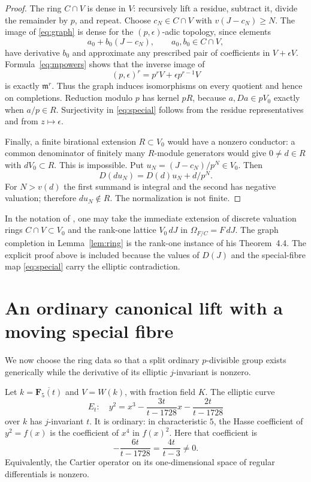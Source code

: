 \documentclass[11pt]{article}
\theoremstyle{remark}\newtheorem{remark}[theorem]{Remark}
\begin{document}
\begin{proof}
The ring $C\cap V$ is dense in $V$: recursively lift a residue, subtract it, divide the remainder by $p$, and repeat. Choose $c_N\in C\cap V$ with $v(J-c_N)\geq N$. The image of \eqref{eq:graph} is dense for the $(p,\epsilon)$-adic topology, since elements
\[
 a_0+b_0(J-c_N),\qquad a_0,b_0\in C\cap V,
\]
have derivative $b_0$ and approximate any prescribed pair of coefficients in $V+\epsilon V$. Formula~\eqref{eq:mpowers} shows that the inverse image of
\[
 (p,\epsilon)^r=p^rV+\epsilon p^{r-1}V
\]
is exactly $\mathfrak m^r$. Thus the graph induces isomorphisms on every quotient and hence on completions. Reduction modulo $p$ has kernel $pR$, because $a,Da\in pV_0$ exactly when $a/p\in R$. Surjectivity in \eqref{eq:special} follows from the residue representatives and from $z\mapsto\epsilon$.

Finally, a finite birational extension $R\subset V_0$ would have a nonzero conductor: a common denominator of finitely many $R$-module generators would give $0\ne d\in R$ with $dV_0\subset R$. This is impossible. Put $u_N=(J-c_N)/p^N\in V_0$. Then
\[
 D(du_N)=D(d)u_N+d/p^N.
\]
For $N>v(d)$ the first summand is integral and the second has negative valuation; therefore $du_N\notin R$. The normalization is not finite.
\end{proof}

In the notation of \citet[Theorem~4.1]{OlberdingBad}, one may take the immediate extension of discrete valuation rings $C\cap V\subset V_0$ and the rank-one lattice $V_0\,dJ$ in $\Omega_{F/C}=F\,dJ$. The graph completion in Lemma~\ref{lem:ring} is the rank-one instance of his Theorem~4.4. The explicit proof above is included because the values of $D(J)$ and the special-fibre map \eqref{eq:special} carry the elliptic contradiction.

\section{An ordinary canonical lift with a moving special fibre}

We now choose the ring data so that a split ordinary $p$-divisible group exists generically while the derivative of its elliptic $j$-invariant is nonzero.

Let $k=\overline{\mathbf F_5(t)}$ and $V=W(k)$, with fraction field $K$. The elliptic curve
\begin{equation}\label{eq:model}
 E_t:\quad y^2=x^3-\frac{3t}{t-1728}x-\frac{2t}{t-1728}
\end{equation}
over $k$ has $j$-invariant $t$. It is ordinary: in characteristic $5$, the Hasse coefficient of $y^2=f(x)$ is the coefficient of $x^4$ in $f(x)^2$. Here that coefficient is
\[
 -\frac{6t}{t-1728}=\frac{4t}{t-3}\ne0.
\]
Equivalently, the Cartier operator on its one-dimensional space of regular differentials is nonzero.
\end{document}
